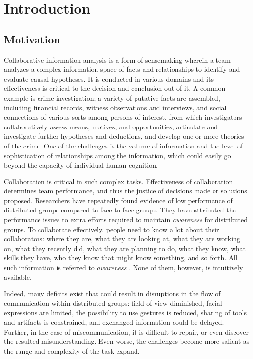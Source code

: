 \section{Introduction}\label{introduction}

\subsection{Motivation}

Collaborative information analysis is a form of sensemaking wherein a team analyzes a complex information space of facts and relationships to identify and evaluate causal hypotheses. It is conducted in various domains and its effectiveness is critical to the decision and conclusion out of it. A common example is crime investigation; a variety of putative facts are assembled, including financial records, witness observations and interviews, and social connections of various sorts among persons of interest, from which investigators collaboratively assess means, motives, and opportunities, articulate and investigate further hypotheses and deductions, and develop one or more theories of the crime. One of the challenges is the volume of information and the level of sophistication of relationships among the information, which could easily go beyond the capacity of individual human cognition. 

Collaboration is critical in such complex tasks. Effectiveness of collaboration determines team performance, and thus the justice of decisions made or solutions proposed. Researchers have repeatedly found evidence of low performance of distributed groups compared to face-to-face groups. They have attributed the performance issues to extra efforts required to maintain \textit{awareness} for distributed groups. To collaborate effectively, people need to know a lot about their collaborators: where they are, what they are looking at, what they are working on, what they recently did, what they are planning to do, what they know, what skills they have, who they know that might know something, and so forth. All such information is referred to \textit{awareness} \citep{Heath2002d, Gutwin1998f}. None of them, however, is intuitively available.

 Indeed, many deficits exist that could result in disruptions in the flow of communication within distributed groups: field of view diminished, facial expressions are limited, the possibility to use gestures is reduced, sharing of tools and artifacts is constrained, and exchanged information could be delayed. Further, in the case of miscommunication, it is difficult to repair, or even discover the resulted misunderstanding. Even worse, the challenges become more salient as the range and complexity of the task expand. 
 
